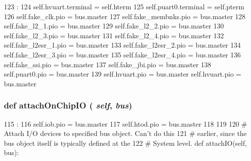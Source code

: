 \begin{DoxyCode}
123                            :
124         self.hvuart.terminal = self.hterm
125         self.puart0.terminal = self.pterm
126         self.fake_clk.pio = bus.master
127         self.fake_membnks.pio = bus.master
128         self.fake_l2_1.pio = bus.master
129         self.fake_l2_2.pio = bus.master
130         self.fake_l2_3.pio = bus.master
131         self.fake_l2_4.pio = bus.master
132         self.fake_l2esr_1.pio = bus.master
133         self.fake_l2esr_2.pio = bus.master
134         self.fake_l2esr_3.pio = bus.master
135         self.fake_l2esr_4.pio = bus.master
136         self.fake_ssi.pio = bus.master
137         self.fake_jbi.pio = bus.master
138         self.puart0.pio = bus.master
139         self.hvuart.pio = bus.master
        self.hvuart.pio = bus.master
\end{DoxyCode}
\hypertarget{classT1000_1_1T1000_abd74cec934f25d2881d5fdd0d5e7f512}{
\subsubsection[{attachOnChipIO}]{\setlength{\rightskip}{0pt plus 5cm}def attachOnChipIO ( {\em self}, \/   {\em bus})}}
\label{classT1000_1_1T1000_abd74cec934f25d2881d5fdd0d5e7f512}



\begin{DoxyCode}
115                                  :
116         self.iob.pio = bus.master
117         self.htod.pio = bus.master
118 
119 
120     # Attach I/O devices to specified bus object.  Can't do this
121     # earlier, since the bus object itself is typically defined at the
122     # System level.
    def attachIO(self, bus):
\end{DoxyCode}


